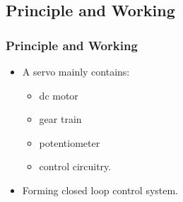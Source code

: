 \documentclass[table,10pt,red]{beamer}	%
\begin{document}
\subsection{Principle and Working}
\begin{frame}
	\frametitle{Principle and Working}
	\begin{itemize}
		\item
		A servo mainly contains:
		
		
		\begin{itemize}
			\pause
			\item
			dc motor
			\pause
			\item
			gear train
			\pause
			\item
			potentiometer
			\pause
			\item
			control circuitry.\\
			\pause
		\end{itemize}
		
		
		\item
		Forming closed loop control system.\\
	\end{itemize}
\end{frame}


\end{document}
